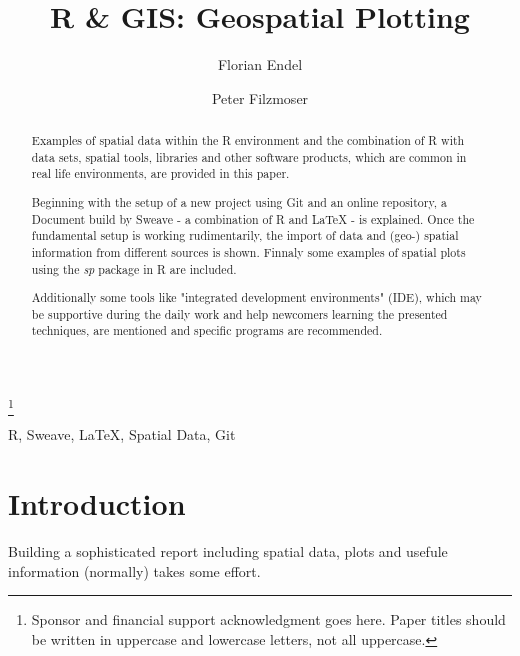 \documentclass{ifacconf}
\begin{document}
\begin{frontmatter}

\title{R \& GIS: Geospatial Plotting} 

\thanks[footnoteinfo]{Sponsor and financial support acknowledgment
goes here. Paper titles should be written in uppercase and lowercase
letters, not all uppercase.}

\author[First]{Florian Endel} 
\author[Second]{Peter Filzmoser} 

\address[First]{FFG IFEDH project, Student at Vienna University of Technology (e-mail: florian@endel.at).}
\address[Second]{Department of Statistics and Probability Theory,
Vienna University of Technology (e-mail: P.Filzmoser@tuwien.ac.at)}

\begin{abstract}                %
Examples of spatial data within the R environment and the combination of R with data sets, spatial
tools, libraries and other software products, which are common in real life environments, are provided in this paper.

Beginning with the setup of a new project using Git and an online repository, a Document build by Sweave - a
combination of R and \LaTeX{} - is explained. Once the fundamental setup is working rudimentarily, the import
of data and (geo-) spatial information from different sources is shown. Finnaly some examples of spatial plots
using the \textit{sp} package in R are  included.

Additionally some tools like "integrated development environments" (IDE), 
which may be supportive during the daily work
and help newcomers learning the presented techniques, 
are mentioned and specific programs are recommended.
\end{abstract}

\begin{keyword}
R, Sweave, \LaTeX{}, Spatial Data, Git
\end{keyword}

\end{frontmatter}

\section{Introduction}
Building a sophisticated report including spatial data, plots and usefule information
(normally) takes some effort. 
\end{document}

